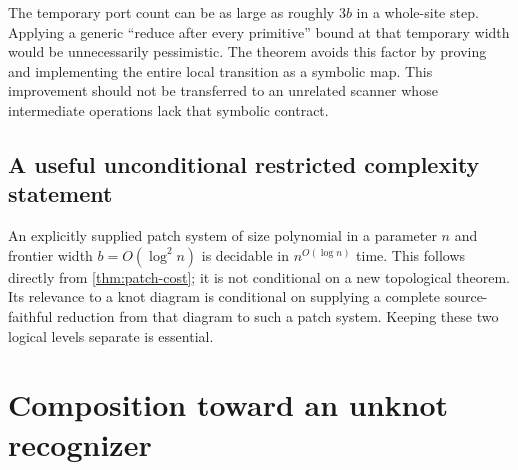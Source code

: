\documentclass[11pt,letterpaper]{article}
\theoremstyle{definition}
\begin{document}
The temporary port count can be as large as roughly $3b$ in a whole-site step. Applying a generic ``reduce after every primitive'' bound at that temporary width would be unnecessarily pessimistic. The theorem avoids this factor by proving and implementing the entire local transition as a symbolic map. This improvement should not be transferred to an unrelated scanner whose intermediate operations lack that symbolic contract.

\subsection{A useful unconditional restricted complexity statement}
An explicitly supplied patch system of size polynomial in a parameter $n$ and frontier width $b=O(\log^2 n)$ is decidable in $n^{O(\log n)}$ time. This follows directly from \cref{thm:patch-cost}; it is not conditional on a new topological theorem. Its relevance to a knot diagram is conditional on supplying a complete source-faithful reduction from that diagram to such a patch system. Keeping these two logical levels separate is essential.

\section{Composition toward an unknot recognizer}
\label{sec:composition}
\end{document}
